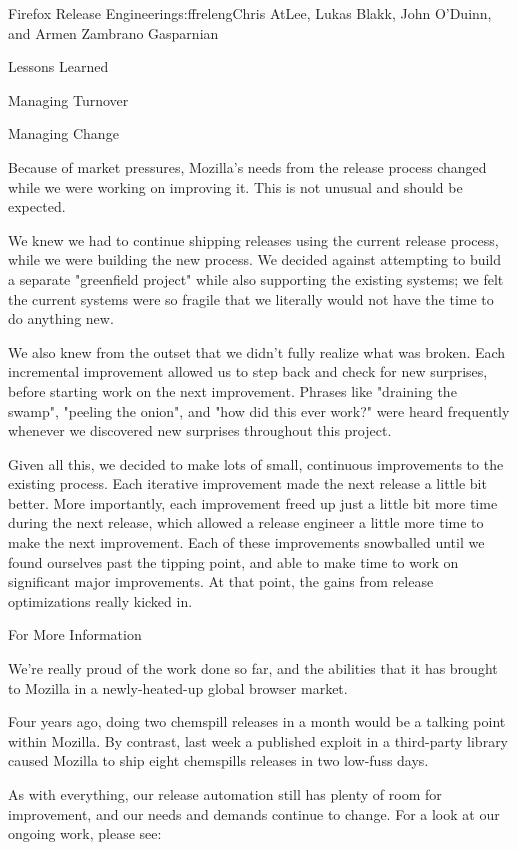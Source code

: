 \begin{aosachapter}{Firefox Release Engineering}{s:ffreleng}{Chris AtLee, Lukas Blakk, John O'Duinn, and Armen Zambrano Gasparnian}
\begin{aosasect1}{Lessons Learned}
\begin{aosasect2}{Managing Turnover}
\end{aosasect2}

\begin{aosasect2}{Managing Change}

Because of market pressures, Mozilla's needs from the release process changed
while we were working on improving it. This is not unusual and should be
expected.

We knew we had to continue shipping releases using the current release process,
while we were building the new process. We decided against attempting to build
a separate "greenfield project" while also supporting the existing
systems; we felt the current systems were so fragile that we literally would
not have the time to do anything new.

We also knew from the outset that we didn't fully realize what was broken. Each
incremental improvement allowed us to step back and check for new surprises,
before starting work on the next improvement. Phrases like "draining the
swamp", "peeling the onion", and "how did this ever work?" were heard
frequently whenever we discovered new surprises throughout this project.

Given all this, we decided to make lots of small, continuous improvements to
the existing process. Each iterative improvement made the next release a little
bit better. More importantly, each improvement freed up just a little bit more
time during the next release, which allowed a release engineer a little more
time to make the next improvement. Each of these improvements snowballed until
we found ourselves past the tipping point, and able to make time to work on
significant major improvements. At that point, the gains from release
optimizations really kicked in.

\end{aosasect2}
\end{aosasect1}

\begin{aosasect1}{For More Information}

We're really proud of the work done so far, and the abilities that it has
brought to Mozilla in a newly-heated-up global browser market.

Four years ago, doing two chemspill releases in a month would be a talking
point within Mozilla. By contrast, last week a published exploit in a third-party
library caused Mozilla to ship eight chemspills releases in two low-fuss days.

As with everything, our release automation still has plenty of room for
improvement, and our needs and demands continue to change. For a look at our
ongoing work, please see:


\end{aosasect1}
\end{aosachapter}
